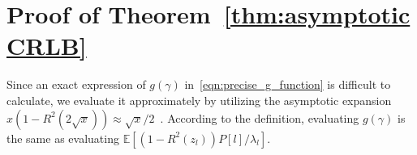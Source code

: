 \documentclass[journal,twocolumn]{IEEEtran}
\theoremstyle{nonumberplain}
\begin{document}
\section{Proof of \textbf{Theorem~\ref{thm:asymptotic CRLB}}}
\label{Proof of Theorem 2}
    Since an exact expression of $g(\gamma)$ in~\eqref{eqn:precise_g_function} is difficult to calculate, we evaluate it approximately by utilizing the asymptotic expansion $x(1-R^2(2\sqrt{x})) \approx \sqrt{x}/2$~\cite{silverman1972special}. According to the definition, evaluating $g(\gamma)$ is the same as evaluating $\mathbb{E}[(1-R^2(z_l))P[l]/\lambda_l]$. 
\end{document}
